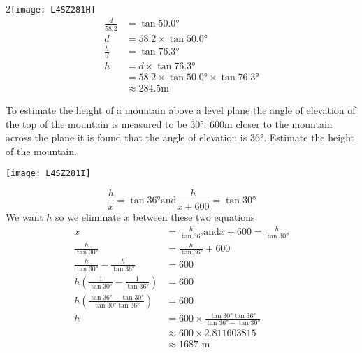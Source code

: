 \begin {multicols}{2}\texttt{[image: L4SZ281H]}
\solution 
\begin{align*}\frac{d}{58.2} &  =  \tan  \ang{50.0}  \\
d &  =  58.2 \times \tan  \ang{50.0}  \\
\frac{h}{d} &  =  \tan  \ang{76.3}  \\
h &  =  d \times \tan  \ang{76.3}  \\
 &  =  58.2 \times \tan  \ang{50.0}  \times \tan  \ang{76.3}  \\
 &  \approx   284.5 \mbox{m}\end{align*}
\end{multicols}

\example To estimate the height of a mountain above a level plane the angle of elevation of the top of the mountain is measured to be $\ang{30} $. $600 \mbox{m}$ closer to the mountain across the plane it is found that the angle of elevation is $\ang{36} $. Estimate the height of the mountain. \\
\begin{center}\texttt{[image: L4SZ281I]}\end{center}
\solution
\begin{equation*}\frac{h}{x} =\tan  \ang{36} \text{and}\frac{h}{x +600} =\tan  \ang{30} 
\end{equation*}
We want $h$ so we eliminate $x$ between these two equations
\begin{align*}x &  =  \frac{h}{\tan  \ang{36} }\text{and}x +600 =\frac{h}{\tan  \ang{30} } \\
\frac{h}{\tan  \ang{30} } &  =  \frac{h}{\tan  \ang{36} } +600 \\
\frac{h}{\tan  \ang{30} } -\frac{h}{\tan  \ang{36} } &  =  600 \\
h \left (\frac{1}{\tan  \ang{30} } -\frac{1}{\tan  \ang{36} }\right ) &  =  600 \\
h \genfrac{(}{)}{}{}{\tan  \ang{36}  -\tan  \ang{30} }{\tan  \ang{30}  \tan  \ang{36} } &  =  600 \\
h &  =  600 \times \frac{\tan  \ang{30}  \tan  \ang{36} }{\tan  \ang{36}  -\tan  \ang{30} } \\
 &  \approx   600 \times 2.811603815 \\
 &  \approx   1687 \mbox{ m}\end{align*}

